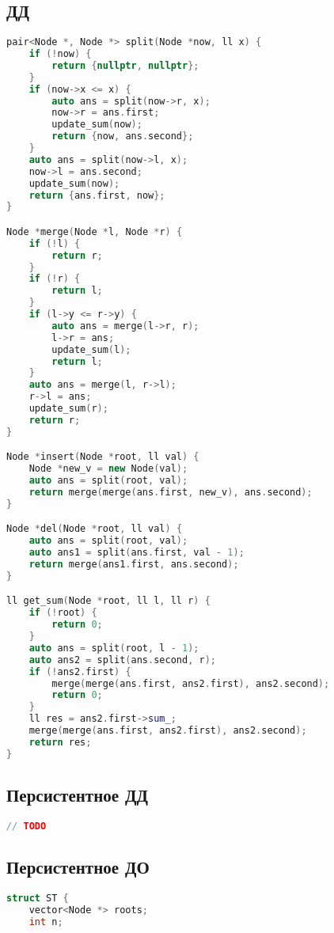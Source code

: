 \documentclass[10pt,a4paper,landscape,twosided]{extarticle}
\begin{document}
\begin{multicols}{3}
\begin{lstlisting}[language=C++]
\end{lstlisting}

\subsection{ДД}
\begin{lstlisting}[language=C++]
pair<Node *, Node *> split(Node *now, ll x) {
    if (!now) {
        return {nullptr, nullptr};
    }
    if (now->x <= x) {
        auto ans = split(now->r, x);
        now->r = ans.first;
        update_sum(now);
        return {now, ans.second};
    }
    auto ans = split(now->l, x);
    now->l = ans.second;
    update_sum(now);
    return {ans.first, now};
}

Node *merge(Node *l, Node *r) {
    if (!l) {
        return r;
    }
    if (!r) {
        return l;
    }
    if (l->y <= r->y) {
        auto ans = merge(l->r, r);
        l->r = ans;
        update_sum(l);
        return l;
    }
    auto ans = merge(l, r->l);
    r->l = ans;
    update_sum(r);
    return r;
}

Node *insert(Node *root, ll val) {
    Node *new_v = new Node(val);
    auto ans = split(root, val);
    return merge(merge(ans.first, new_v), ans.second);
}

Node *del(Node *root, ll val) {
    auto ans = split(root, val);
    auto ans1 = split(ans.first, val - 1);
    return merge(ans1.first, ans.second);
}

ll get_sum(Node *root, ll l, ll r) {
    if (!root) {
        return 0;
    }
    auto ans = split(root, l - 1);
    auto ans2 = split(ans.second, r);
    if (!ans2.first) {
        merge(merge(ans.first, ans2.first), ans2.second);
        return 0;
    }
    ll res = ans2.first->sum_;
    merge(merge(ans.first, ans2.first), ans2.second);
    return res;
}

\end{lstlisting}

\subsection{Персистентное ДД}
\begin{lstlisting}[language=C++]
// TODO

\end{lstlisting}

\subsection{Персистентное ДО}
\begin{lstlisting}[language=C++]
struct ST {
    vector<Node *> roots;
    int n;


\end{lstlisting}
\end{multicols}
\end{document}
